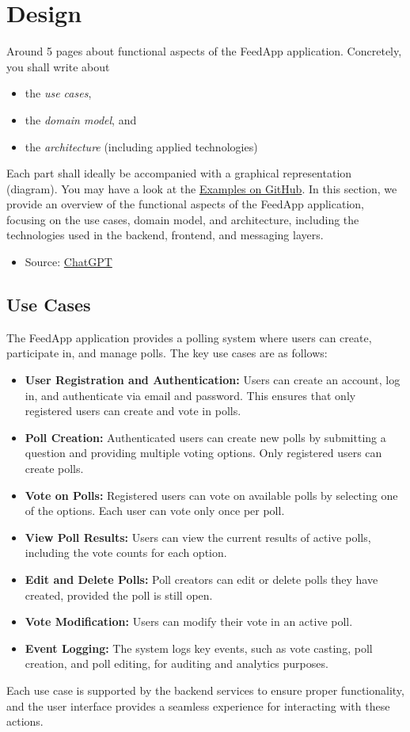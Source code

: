 \section{Design}
\label{sec:design}
Around 5 pages about functional aspects of the FeedApp application.
Concretely, you shall write about 
\begin{itemize}
	\item the \emph{use cases},
	\item the \emph{domain model}, and
	\item the \emph{architecture} (including applied technologies)
\end{itemize}
Each part shall ideally be accompanied with a graphical representation (diagram).
You may have a look at the \href{https://github.com/selabhvl/dat250public/blob/master/projectdescription/README.md}{Examples on GitHub}.
In this section, we provide an overview of the functional aspects of the FeedApp application, focusing on the use cases, domain model, and architecture, including the technologies used in the backend, frontend, and messaging layers.
\begin{itemize}
    \item Source: \href{https://chatgpt.com/share/672fbc4f-ecf4-8007-b147-6759b1884b9c}{ChatGPT}
\end{itemize}
\subsection{Use Cases}
The FeedApp application provides a polling system where users can create, participate in, and manage polls. The key use cases are as follows:
\begin{itemize}
    \item \textbf{User Registration and Authentication:} Users can create an account, log in, and authenticate via email and password. This ensures that only registered users can create and vote in polls.
    \item \textbf{Poll Creation:} Authenticated users can create new polls by submitting a question and providing multiple voting options. Only registered users can create polls.
    \item \textbf{Vote on Polls:} Registered users can vote on available polls by selecting one of the options. Each user can vote only once per poll.
    \item \textbf{View Poll Results:} Users can view the current results of active polls, including the vote counts for each option.
    \item \textbf{Edit and Delete Polls:} Poll creators can edit or delete polls they have created, provided the poll is still open.
    \item \textbf{Vote Modification:} Users can modify their vote in an active poll.
    \item \textbf{Event Logging:} The system logs key events, such as vote casting, poll creation, and poll editing, for auditing and analytics purposes.
\end{itemize}
Each use case is supported by the backend services to ensure proper functionality, and the user interface provides a seamless experience for interacting with these actions.
